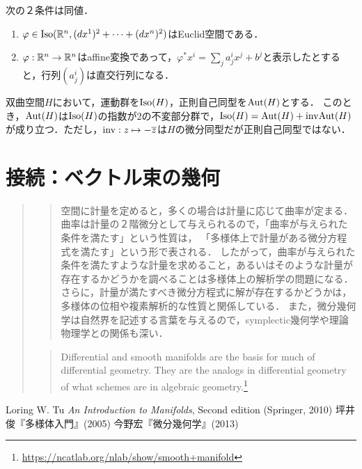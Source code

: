 \documentclass[uplatex,dvipdfmx]{jsreport}
\begin{document}
\begin{example}[Euclid空間の運動]
    次の２条件は同値．
    \begin{enumerate}
        \item $\varphi\in\mathrm{Iso}(\mathbb{R}^n,(dx^1)^2+\cdots+(dx^n)^2)$はEuclid空間である．
        \item $\varphi:\mathbb{R}^n\to\mathbb{R}^n$はaffine変換であって，$\varphi^*x^i=\sum_ja^i_jx^j+b^j$と表示したとすると，行列$(a^i_j)$は直交行列になる．
    \end{enumerate}
\end{example}

\begin{example}[双曲空間の運動]
    双曲空間$H$において，運動群を$\mathrm{Iso}(H)$，正則自己同型を$\mathrm{Aut}(H)$とする．
    このとき，$\mathrm{Aut}(H)$は$\mathrm{Iso}(H)$の指数が2の不変部分群で，$\mathrm{Iso}(H)=\mathrm{Aut}(H)+\mathrm{inv}\mathrm{Aut}(H)$が成り立つ．ただし，$\mathrm{inv}:z\mapsto -\overline{z}$は$H$の微分同型だが正則自己同型ではない．
\end{example}

\chapter{接続：ベクトル束の幾何}

\begin{quotation}
    \begin{quote}
        空間に計量を定めると，多くの場合は計量に応じて曲率が定まる．
        曲率は計量の２階微分として与えられるので，「曲率が与えられた条件を満たす」という性質は，
        「多様体上で計量がある微分方程式を満たす」という形で表される．
        したがって，曲率が与えられた条件を満たすような計量を求めること，あるいはそのような計量が存在するかどうかを調べることは多様体上の解析学の問題になる．
        さらに，計量が満たすべき微分方程式に解が存在するかどうかは，多様体の位相や複素解析的な性質と関係している．
        また，微分幾何学は自然界を記述する言葉を与えるので，symplectic幾何学や理論物理学との関係も深い．
    \end{quote}
    \begin{quote}
        Differential and smooth manifolds are the basis for much of differential geometry. They are the analogs in differential geometry of what schemes are in algebraic geometry.\footnote{\url{https://ncatlab.org/nlab/show/smooth+manifold}}
    \end{quote}
\end{quotation}

\begin{thebibliography}{9}
    Loring W. Tu \textit{An Introduction to Manifolds}, Second edition (Springer, 2010)
    坪井俊『多様体入門』(2005)
    今野宏『微分幾何学』(2013)
\end{thebibliography}
\end{document}
